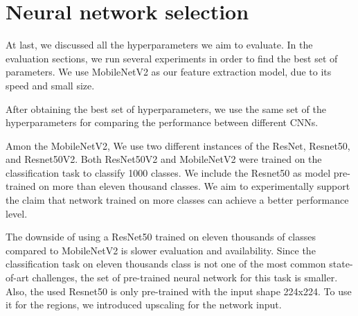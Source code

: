 
\section{Neural network selection}

At last, we discussed all the hyperparameters we aim to evaluate. In the evaluation sections, we run several experiments in order to find the best set of parameters. We use MobileNetV2 as our feature extraction model, due to its speed and small size.

After obtaining the best set of hyperparameters, we use the same set of the hyperparameters for comparing the performance between different CNNs.

Amon the MobileNetV2, We use two different instances of the ResNet, Resnet50, and Resnet50V2. Both ResNet50V2 and MobileNetV2 were trained on the classification task to classify 1000 classes. We include the Resnet50 as model pre-trained on more than eleven thousand classes. We aim to experimentally support the claim that network trained on more classes can achieve a better performance level. 

The downside of using a ResNet50 trained on eleven thousands of classes compared to MobileNetV2 is slower evaluation and availability. Since the classification task on eleven thousands class is not one of the most common state-of-art challenges, the set of pre-trained neural network for this task is smaller. Also, the used Resnet50 is only pre-trained with the input shape 224x224. To use it for the regions, we introduced upscaling for the network input. 








